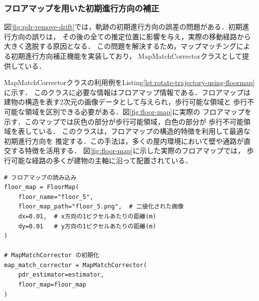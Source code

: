 

\subsubsection{フロアマップを用いた初期進行方向の補正}

図\ref{fig:pdr-remove-drift}では，軌跡の初期進行方向の誤差の問題がある．初期進行方向の誤りは，
その後の全ての推定位置に影響を与え，実際の移動経路から大きく逸脱する原因となる．
この問題を解決するため，マップマッチングによる初期進行方向補正機能を実装しており，
MapMatchCorrectorクラスとして提供している．

MapMatchCorrectorクラスの利用例をListing\ref{lst:rotate-trajectory-using-floormap}に示す．
このクラスに必要な情報はフロアマップ情報である．フロアマップは
建物の構造を表す2次元の画像データとして与えられ，歩行可能な領域と
歩行不可能な領域を区別できる必要がある．図\ref{fig:floor-map}に実際の
フロアマップを示す．このマップでは灰色の部分が歩行可能領域，白色の部分が
歩行不可能領域を表している．
このクラスは，フロアマップの構造的特徴を利用して最適な初期進行方向を
推定する．この手法は，多くの屋内環境において壁や通路が直交する特徴を活用する．
図\ref{fig:floor-map}に示した実際のフロアマップでは，
歩行可能な経路の多くが建物の主軸に沿って配置されている．

\begin{lstlisting}[caption={MapMatchCorrectorの使用例},label=lst:rotate-trajectory-using-floormap,float=ht]
# フロアマップの読み込み
floor_map = FloorMap(
    floor_name="floor_5",
    floor_map_path="floor_5.png",  # 二値化された画像
    dx=0.01,  # x方向の1ピクセルあたりの距離(m)
    dy=0.01   # y方向の1ピクセルあたりの距離(m)
)

# MapMatchCorrector の初期化
map_match_corrector = MapMatchCorrector(
    pdr_estimator=estimator,
    floor_map=floor_map
)
\end{lstlisting}


